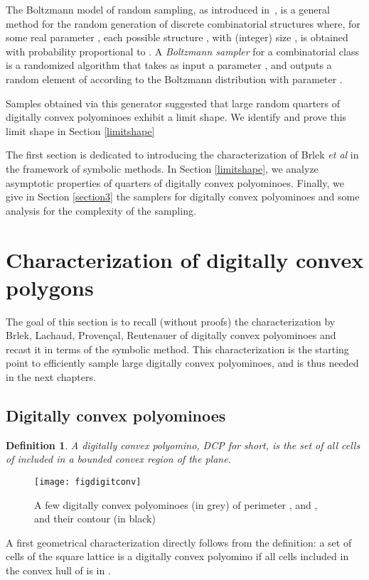 \documentclass{article}
\newtheorem{definition}[theorem]{Definition}
\begin{document}
The Boltzmann model of random sampling, as introduced
in~\cite{DuFlLoSc04}, is a general method for the random generation of
discrete combinatorial structures where, for some real parameter
, each possible structure , with (integer) size
, is obtained with probability proportional to
.
A \emph{Boltzmann sampler} for a
combinatorial class  is a randomized algorithm that takes
as input a parameter , and outputs a random element of
 according to the Boltzmann distribution with parameter .










Samples obtained via this generator suggested that large random quarters of digitally convex polyominoes exhibit a limit shape. 
We identify and prove this limit shape in Section \ref{limitshape}


The first
section is dedicated to introducing the characterization of Brlek
\emph{et al} \cite{Brlek09a} in the framework of symbolic methods. In Section \ref{limitshape},
we analyze asymptotic properties of quarters of digitally convex polyominoes. Finally, we give 
 in Section \ref{section3} the samplers for digitally convex polyominoes and
some analysis for the complexity of the sampling. 




\section{Characterization of digitally convex polygons}
The goal of this section is to recall (without proofs) the characterization by Brlek, Lachaud,
Proven\c{c}al, Reutenauer \cite{Brlek09a} of digitally convex
polyominoes and recast it in terms of the symbolic method. This characterization is the starting point to
efficiently sample large digitally convex polyominoes,
and is thus needed in the next chapters. 



\subsection{Digitally convex polyominoes}
\begin{definition}
A \emph{digitally convex polyomino}, DCP for short, is the set of all cells of 
included in a bounded convex region of the plane.
\end{definition}


\begin{figure}
\begin{center}
\texttt{[image: figdigitconv]}
\end{center}
\caption{A few digitally convex polyominoes (in grey) of perimeter , and , and their contour (in black) }
\label{polex}
\end{figure}
A first geometrical characterization directly follows from the definition: a set of cells of the
square lattice  is a digitally convex polyomino if all cells included in the convex hull of 
is in .
\end{document}
